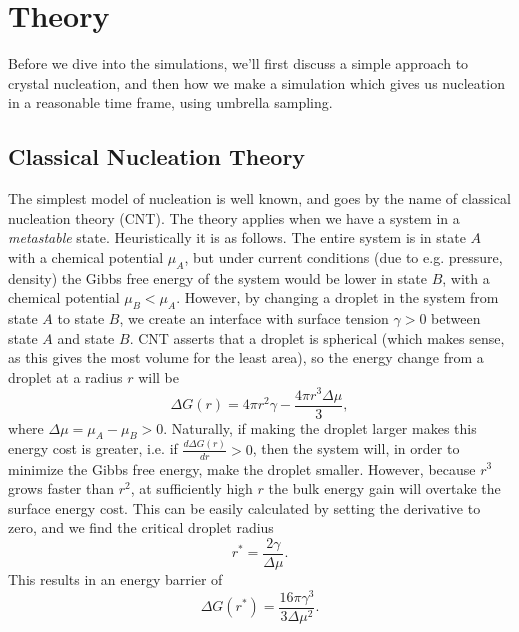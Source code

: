 \documentclass[thesis]{subfiles}
\begin{document}
\section{Theory}

Before we dive into the simulations, we'll first discuss a simple approach to crystal nucleation, and then how we make a simulation which gives us nucleation in a reasonable time frame, using umbrella sampling.

\subsection{Classical Nucleation Theory}

The simplest model of nucleation is well known, and goes by the name of classical nucleation theory (CNT). The theory applies when we have a system in a \emph{metastable} state. Heuristically it is as follows. The entire system is in state $A$ with a chemical potential $\mu_A$, but under current conditions (due to e.g. pressure, density) the Gibbs free energy of the system would be lower in state $B$, with a chemical potential $\mu_B < \mu_A$. However, by changing a droplet in the system from state $A$ to state $B$, we create an interface with surface tension $\gamma > 0$ between state $A$ and state $B$. CNT asserts that a droplet is spherical (which makes sense, as this gives the most volume for the least area), so the energy change from a droplet at a radius $r$ will be	
\begin{equation}
	\Delta G(r) = 4\pi r^2 \gamma - \frac{4\pi r^3 \Delta\mu}{3},
\end{equation}
where $\Delta\mu = \mu_A - \mu_B > 0$. Naturally, if making the droplet larger makes this energy cost is greater, i.e. if $\frac{d\Delta G(r)}{dr} > 0$, %
then the system will, in order to minimize the Gibbs free energy, make the droplet smaller. However, because $r^3$ grows faster than $r^2$, at sufficiently high $r$ the bulk energy gain will overtake the surface energy cost. This can be easily calculated by setting the derivative to zero, and we find the critical droplet radius
\begin{equation}
	r^* = \frac{2\gamma}{\Delta\mu}.
\end{equation}
This results in an energy barrier of 
\begin{equation}
	\Delta G (r^*) = \frac{16 \pi \gamma^3}{3 \Delta\mu^2}.
\end{equation}
\end{document}
